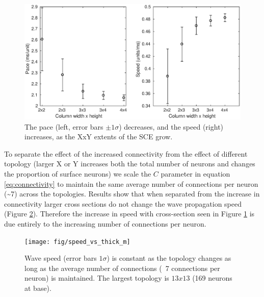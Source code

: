 \begin{figure}[!htb]
 \centering
   \includegraphics[width=\textwidth]{fig/WaveSpeed_Topology}
   \caption{ The pace (left, error bars $\pm 1 \sigma$) decreases, and the speed (right) increases, as the XxY extents of the SCE grow.}
   \label{fig:delay_topology}
\end{figure}
\FloatBarrier

To separate the effect of the increased connectivity from the effect of different topology (larger X or Y increases both the total number of neurons and changes the proportion of surface neurons) we scale the $C$ parameter in equation \ref{eq:connectivity} to maintain the same average number of connections per neuron (\textasciitilde{}7) across the topologies.
Results show that when separated from the increase in connectivity larger cross sections do not change the wave propagation speed (Figure \ref{fig:delay_topology_avgconn}).
Therefore the increase in speed with cross-section seen in Figure \ref{fig:delay_topology} is due entirely to the increasing number of connections per neuron. 

\begin{figure}[!htb]
 \centering
   \texttt{[image: fig/speed\_vs\_thick\_m]}
   \caption{ Wave speed (error bars $1\sigma$) is constant as the topology changes as long as the average number of connections (~7 connections per neuron) is maintained. 
	   The largest topology is $13x13$ (169 neurons at base).}
   \label{fig:delay_topology_avgconn}
\end{figure}

